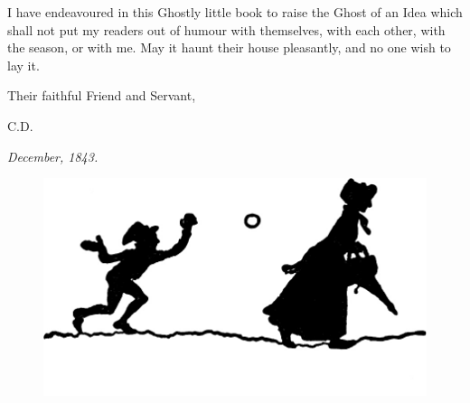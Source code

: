 \documentclass[paper=5.5in:8.5in,BCOR=7mm,twoside,DIV=calc,12pt,usegeometry]{scrbook} %
\begin{document}

\pagestyle{headings}
\renewcommand*{\chapterpagestyle}{plain}
\newcommand{\moderatelyhuge}{\fontsize{40}{50}\selectfont}

\lettrine[loversize=.85]{I}{} have endeavoured in this Ghostly little book to raise the Ghost of an Idea which shall not put my readers out of humour with themselves, with each other, with the season, or with me. May it haunt their house pleasantly, and no one wish to lay it.

Their faithful Friend and Servant,

\begin{flushright}
\textsc{C.D.}
\end{flushright}

\textit{December, 1843.}
\vfill
\begin{figure}[h]
\centering
\includegraphics[width=.8\textwidth]{snowball}
\end{figure}
\end{document}
